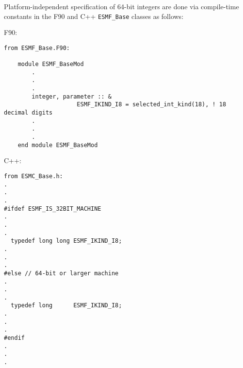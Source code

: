 
Platform-independent specification of 64-bit integers are done via
compile-time constants in the F90 and C++ {\tt ESMF\_Base} classes as follows:

F90:
\begin{verbatim}
from ESMF_Base.F90:

    module ESMF_BaseMod
        .
        .
        .
        integer, parameter :: &
                     ESMF_IKIND_I8 = selected_int_kind(18), ! 18 decimal digits
        .
        .
        .
    end module ESMF_BaseMod
\end{verbatim}

C++:
\begin{verbatim}
from ESMC_Base.h:
.
.
.
#ifdef ESMF_IS_32BIT_MACHINE
.
.
.
  typedef long long ESMF_IKIND_I8;
.
.
.
#else // 64-bit or larger machine
.
.
.
  typedef long      ESMF_IKIND_I8;
.
.
.
#endif
.
.
.
\end{verbatim}
